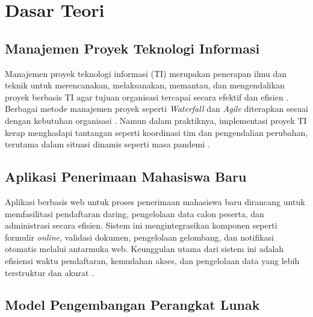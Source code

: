 \section{Dasar Teori} \label{II.Teori}

\subsection{Manajemen Proyek Teknologi Informasi} \label{II.ManajemenProyekTI}
Manajemen proyek teknologi informasi (TI) merupakan penerapan ilmu dan teknik untuk merencanakan, melaksanakan, memantau, dan mengendalikan proyek berbasis TI agar tujuan organisasi tercapai secara efektif dan efisien \cite{witania2016analisis}. Berbagai metode manajemen proyek seperti \textit{Waterfall} dan \textit{Agile} diterapkan sesuai dengan kebutuhan organisasi \cite{witania2016analisis}. Namun dalam praktiknya, implementasi proyek TI kerap menghadapi tantangan seperti koordinasi tim dan pengendalian perubahan, terutama dalam situasi dinamis seperti masa pandemi \cite{pradana2020tantangan}.\par

\subsection{Aplikasi Penerimaan Mahasiswa Baru} \label{II.AplikasiPMB}
Aplikasi berbasis web untuk proses penerimaan mahasiswa baru dirancang untuk memfasilitasi pendaftaran daring, pengelolaan data calon peserta, dan administrasi secara efisien. Sistem ini mengintegrasikan komponen seperti formulir \textit{online}, validasi dokumen, pengelolaan gelombang, dan notifikasi otomatis melalui antarmuka web. Keunggulan utama dari sistem ini adalah efisiensi waktu pendaftaran, kemudahan akses, dan pengelolaan data yang lebih terstruktur dan akurat \cite{widiyatmoko2024development}.\par

\subsection{Model Pengembangan Perangkat Lunak} \label{II.ModelPengembangan}

